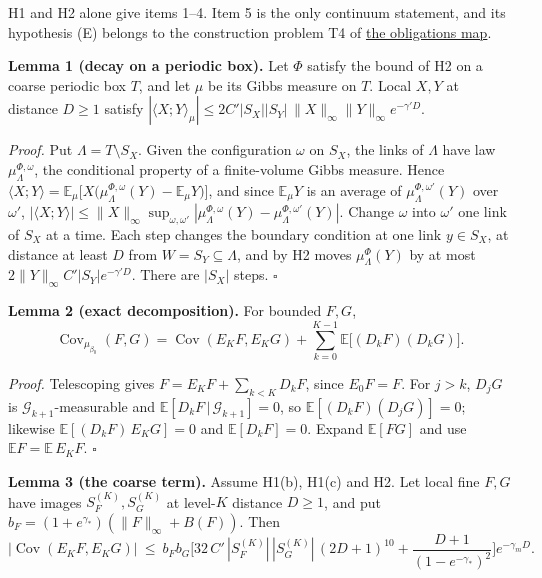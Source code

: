 \documentclass[11pt,a4paper]{article}
\begin{document}
H1 and H2 alone give items 1--4. Item 5 is the only continuum statement,
and its hypothesis (E) belongs to the construction problem T4 of
\href{mass-gap-obligations-lattice.md}{the obligations map}.

\textbf{Lemma 1 (decay on a periodic box).} Let \(\Phi\) satisfy the
bound of H2 on a coarse periodic box \(T\), and let \(\mu\) be its Gibbs
measure on \(T\). Local \(X,Y\) at distance \(D\ge1\) satisfy
\(|\langle X;Y\rangle_\mu|\le2C'|S_X||S_Y|\,\|X\|_\infty\|Y\|_\infty e^{-\gamma'D}\).

\emph{Proof.} Put \(\Lambda=T\setminus S_X\). Given the configuration
\(\omega\) on \(S_X\), the links of \(\Lambda\) have law
\(\mu_\Lambda^{\Phi,\omega}\), the conditional property of a
finite-volume Gibbs measure. Hence
\(\langle X;Y\rangle=\mathbb E_\mu\big[X\big(\mu_\Lambda^{\Phi,\omega}(Y)-\mathbb E_\mu Y\big)\big]\),
and since \(\mathbb E_\mu Y\) is an average of
\(\mu_\Lambda^{\Phi,\omega'}(Y)\) over \(\omega'\),
\(|\langle X;Y\rangle|\le\|X\|_\infty\sup_{\omega,\omega'}|\mu_\Lambda^{\Phi,\omega}(Y)-\mu_\Lambda^{\Phi,\omega'}(Y)|\).
Change \(\omega\) into \(\omega'\) one link of \(S_X\) at a time. Each
step changes the boundary condition at one link \(y\in S_X\), at
distance at least \(D\) from \(W=S_Y\subseteq\Lambda\), and by H2 moves
\(\mu_\Lambda^{\Phi}(Y)\) by at most
\(2\|Y\|_\infty C'|S_Y|e^{-\gamma'D}\). There are \(|S_X|\) steps.
\(\square\)

\textbf{Lemma 2 (exact decomposition).} For bounded \(F,G\),
\[\operatorname{Cov}_{\mu_{\beta_0}}(F,G)=\operatorname{Cov}(E_KF,E_KG)+\sum_{k=0}^{K-1}\mathbb E\big[(D_kF)(D_kG)\big].\]

\emph{Proof.} Telescoping gives \(F=E_KF+\sum_{k<K}D_kF\), since
\(E_0F=F\). For \(j>k\), \(D_jG\) is \(\mathcal G_{k+1}\)-measurable and
\(\mathbb E[D_kF\,|\,\mathcal G_{k+1}]=0\), so
\(\mathbb E[(D_kF)(D_jG)]=0\); likewise \(\mathbb E[(D_kF)\,E_KG]=0\)
and \(\mathbb E[D_kF]=0\). Expand \(\mathbb E[FG]\) and use
\(\mathbb E F=\mathbb E\,E_KF\). \(\square\)

\textbf{Lemma 3 (the coarse term).} Assume H1(b), H1(c) and H2. Let
local fine \(F,G\) have images \(S_F^{(K)},S_G^{(K)}\) at level-\(K\)
distance \(D\ge1\), and put \(b_F=(1+e^{\gamma_*})(\|F\|_\infty+B(F))\).
Then
\[|\operatorname{Cov}(E_KF,E_KG)|\ \le\ b_Fb_G\Big[32\,C'\,|S_F^{(K)}|\,|S_G^{(K)}|\,(2D+1)^{10}+\frac{D+1}{(1-e^{-\gamma_*})^2}\Big]e^{-\gamma_mD}.\]
\end{document}
